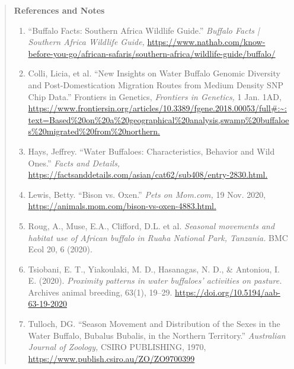 \documentclass[12pt]{article}
\begin{document}
\newpage

\begin{quote}
{\bf References and Notes}

\begin{enumerate}
\item “Buffalo Facts: Southern Africa Wildlife Guide.” {\it Buffalo Facts | Southern Africa Wildlife Guide,} \url{https://www.nathab.com/know-before-you-go/african-safaris/southern-africa/wildlife-guide/buffalo/}
\item Colli, Licia, et al. “New Insights on Water Buffalo Genomic Diversity and Post-Domestication Migration Routes from Medium Density SNP Chip Data.” Frontiers in Genetics, {\it Frontiers in Genetics,} 1 Jan. 1AD, \url{https://www.frontiersin.org/articles/10.3389/fgene.2018.00053/full#:~:text=Based%20on%20a%20geographical%20analysis,swamp%20buffaloes%20migrated%20from%20northern.}
\item Hays, Jeffrey. “Water Buffaloes: Characteristics, Behavior and Wild Ones.” {\it Facts and Details,} \url{https://factsanddetails.com/asian/cat62/sub408/entry-2830.html.}
\item Lewis, Betty. “Bison vs. Oxen.” {\it Pets on Mom.com,} 19 Nov. 2020, \url{https://animals.mom.com/bison-vs-oxen-4883.html.}
\item Roug, A., Muse, E.A., Clifford, D.L. et al. {\it Seasonal movements and habitat use of African buffalo in Ruaha National Park, Tanzania.} BMC Ecol 20, 6 (2020).
\item Tsiobani, E. T., Yiakoulaki, M. D., Hasanagas, N. D., \& Antoniou, I. E. (2020). {\it Proximity patterns in water buffaloes' activities on pasture.} Archives animal breeding, 63(1), 19–29. \url{https://doi.org/10.5194/aab-63-19-2020}
\item Tulloch, DG. “Season Movement and Distribution of the Sexes in the Water Buffalo, Bubalus Bubalis, in the Northern Territory.” {\it Australian Journal of Zoology,} CSIRO PUBLISHING, 1970, \url{https://www.publish.csiro.au/ZO/ZO9700399}
\end{enumerate}
\end{quote}
\end{document}
